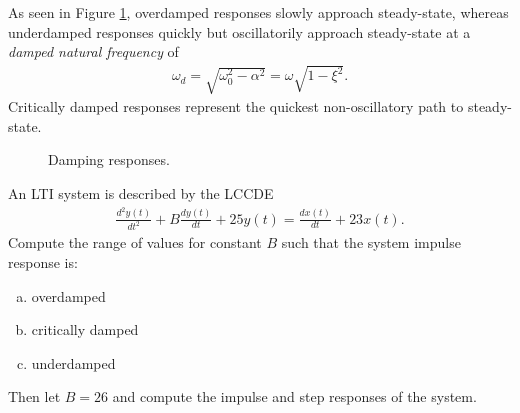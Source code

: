 \documentclass{report}
\begin{document}
\\ \\
As seen in Figure \ref{damping}, overdamped responses slowly approach steady-state, whereas underdamped responses quickly but oscillatorily approach steady-state at a \emph{damped natural frequency} of 
\begin{align}
    \omega_d = \sqrt{\omega_0^2-\alpha^2} = \omega\sqrt{1-\xi^2}.
\end{align}
Critically damped responses represent the quickest non-oscillatory path to steady-state. 
\begin{figure}[!hbt]
    \caption{Damping responses.}
    \label{damping}
    \centering
    \resizebox{0.65\textwidth}{!}{%
        
    }
\end{figure}
\pagebreak
\begin{example}
    An LTI system is described by the LCCDE 
    \begin{align*}
        \frac{d^2y(t)}{dt^2} + B\frac{dy(t)}{dt} + 25y(t) = \frac{dx(t)}{dt} + 23x(t).
    \end{align*}
    Compute the range of values for constant $B$ such that the system impulse response is:
    \begin{enumerate}[(a)]
        \item overdamped
        \item critically damped
        \item underdamped
    \end{enumerate}
    Then let $B=26$ and compute the impulse and step responses of the system.
\end{example}
\end{document}
